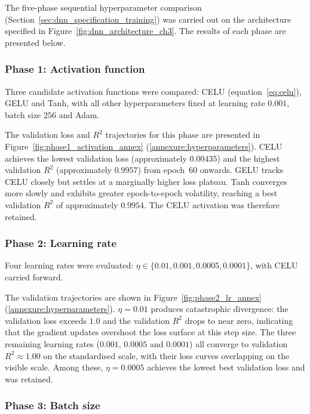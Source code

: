 The five-phase sequential hyperparameter comparison
(Section~\ref{sec:dnn_specification_training}) was carried out on the
architecture specified in Figure~\ref{fig:dnn_architecture_ch3}.
The results of each phase are presented below.

\subsubsection{Phase 1: Activation function}

Three candidate activation functions were compared: CELU
(equation~\eqref{eq:celu}), GELU and Tanh, with all other
hyperparameters fixed at learning rate $0.001$, batch size $256$ and Adam.

\noindent
The validation loss and $R^2$ trajectories for this phase are presented in
Figure~\ref{fig:phase1_activation_annex}
(\ref{annexure:hyperparameters}).  CELU achieves the
lowest validation loss (approximately $0.00435$) and the highest
validation $R^2$ (approximately $0.9957$) from epoch~60 onwards.  GELU
tracks CELU closely but settles at a marginally higher loss
plateau.  Tanh converges more slowly and exhibits greater epoch-to-epoch
volatility, reaching a best validation $R^2$ of approximately $0.9954$.
The CELU activation was therefore retained.

\subsubsection{Phase 2: Learning rate}

Four learning rates were evaluated:
$\eta \in \{0.01, 0.001, 0.0005, 0.0001\}$, with CELU carried
forward.

\noindent
The validation trajectories are shown in
Figure~\ref{fig:phase2_lr_annex}
(\ref{annexure:hyperparameters}).
$\eta = 0.01$ produces catastrophic divergence: the validation loss
exceeds $1.0$ and the validation $R^2$ drops to near zero, indicating
that the gradient updates overshoot the loss surface at this step size.
The three remaining learning rates ($0.001$, $0.0005$ and $0.0001$) all
converge to validation $R^2 \approx 1.00$ on the standardised scale,
with their loss curves overlapping on the visible scale.  Among these,
$\eta = 0.0005$ achieves the lowest best validation loss and was
retained.

\subsubsection{Phase 3: Batch size}

